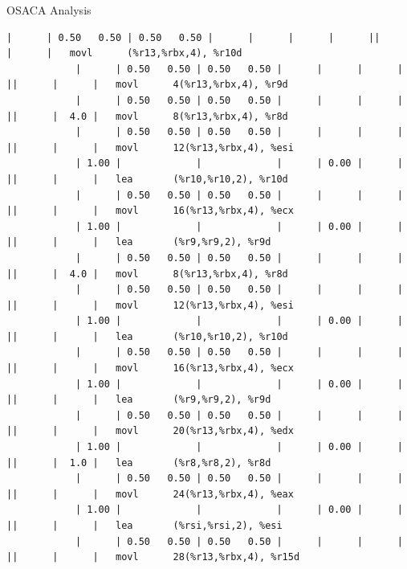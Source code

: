 \documentclass[aspectratio=169,t]{beamer}
\begin{document}
\begin{frame}[fragile]{OSACA Analysis}
\begin{lstlisting}[basicstyle=\tt\fontsize{4pt}{6pt}\selectfont]
            |      | 0.50   0.50 | 0.50   0.50 |      |      |      |      ||      |      |   movl      (%r13,%rbx,4), %r10d
            |      | 0.50   0.50 | 0.50   0.50 |      |      |      |      ||      |      |   movl      4(%r13,%rbx,4), %r9d
            |      | 0.50   0.50 | 0.50   0.50 |      |      |      |      ||      |  4.0 |   movl      8(%r13,%rbx,4), %r8d
            |      | 0.50   0.50 | 0.50   0.50 |      |      |      |      ||      |      |   movl      12(%r13,%rbx,4), %esi
            | 1.00 |             |             |      | 0.00 |      |      ||      |      |   lea       (%r10,%r10,2), %r10d
            |      | 0.50   0.50 | 0.50   0.50 |      |      |      |      ||      |      |   movl      16(%r13,%rbx,4), %ecx
            | 1.00 |             |             |      | 0.00 |      |      ||      |      |   lea       (%r9,%r9,2), %r9d
            |      | 0.50   0.50 | 0.50   0.50 |      |      |      |      ||      |  4.0 |   movl      8(%r13,%rbx,4), %r8d
            |      | 0.50   0.50 | 0.50   0.50 |      |      |      |      ||      |      |   movl      12(%r13,%rbx,4), %esi
            | 1.00 |             |             |      | 0.00 |      |      ||      |      |   lea       (%r10,%r10,2), %r10d
            |      | 0.50   0.50 | 0.50   0.50 |      |      |      |      ||      |      |   movl      16(%r13,%rbx,4), %ecx
            | 1.00 |             |             |      | 0.00 |      |      ||      |      |   lea       (%r9,%r9,2), %r9d
            |      | 0.50   0.50 | 0.50   0.50 |      |      |      |      ||      |      |   movl      20(%r13,%rbx,4), %edx
            | 1.00 |             |             |      | 0.00 |      |      ||      |  1.0 |   lea       (%r8,%r8,2), %r8d
            |      | 0.50   0.50 | 0.50   0.50 |      |      |      |      ||      |      |   movl      24(%r13,%rbx,4), %eax
            | 1.00 |             |             |      | 0.00 |      |      ||      |      |   lea       (%rsi,%rsi,2), %esi
            |      | 0.50   0.50 | 0.50   0.50 |      |      |      |      ||      |      |   movl      28(%r13,%rbx,4), %r15d
    \end{lstlisting}
  \end{frame}
\end{document}
